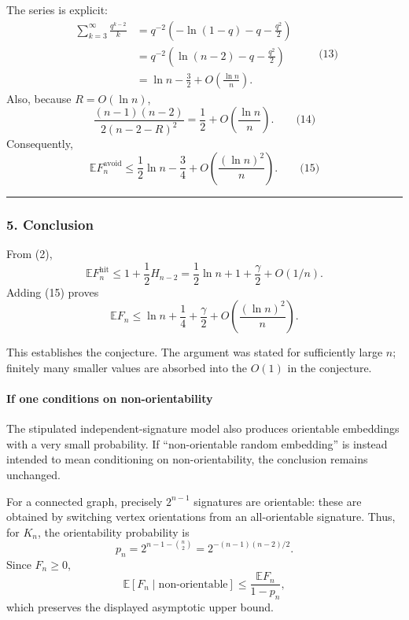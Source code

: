 \documentclass[
  11pt,
  a4paper,
]{article}
\begin{document}
The series is explicit: \begin{equation*}
\begin{aligned}
\sum_{k=3}^{\infty}\frac{q^{k-2}}{k}
&=
q^{-2}\left(-\ln(1-q)-q-\frac{q^2}{2}\right)\\
&=
q^{-2}\left(\ln(n-2)-q-\frac{q^2}{2}\right)\\
&=
\ln n-\frac32+O\!\left(\frac{\ln n}{n}\right).
\end{aligned}
\qquad\text{(13)}
\end{equation*} Also, because \(R=O(\ln n)\), \[
\frac{(n-1)(n-2)}{2(n-2-R)^2}
=
\frac12+O\!\left(\frac{\ln n}{n}\right).
\qquad\text{(14)}
\] Consequently, \[
\boxed{
\mathbb E F_n^{\mathrm{avoid}}
\le
\frac12\ln n-\frac34
+O\!\left(\frac{(\ln n)^2}{n}\right).
}
\qquad\text{(15)}
\]

\begin{center}\rule{0.5\linewidth}{0.5pt}\end{center}

\subsubsection{5. Conclusion}\label{conclusion}

From (2), \[
\mathbb E F_n^{\mathrm{hit}}
\le
1+\frac12H_{n-2}
=
\frac12\ln n+1+\frac{\gamma}{2}+O(1/n).
\] Adding (15) proves \[
\mathbb E F_n
\le
\ln n+\frac14+\frac{\gamma}{2}
+O\!\left(\frac{(\ln n)^2}{n}\right).
\]

This establishes the conjecture. The argument was stated for
sufficiently large \(n\); finitely many smaller values are absorbed into
the \(O(1)\) in the conjecture.

\paragraph{If one conditions on
non-orientability}\label{if-one-conditions-on-non-orientability}

The stipulated independent-signature model also produces orientable
embeddings with a very small probability. If ``non-orientable random
embedding'' is instead intended to mean conditioning on
non-orientability, the conclusion remains unchanged.

For a connected graph, precisely \(2^{n-1}\) signatures are orientable:
these are obtained by switching vertex orientations from an
all-orientable signature. Thus, for \(K_n\), the orientability
probability is \[
p_n=2^{n-1-\binom n2}
=2^{-(n-1)(n-2)/2}.
\] Since \(F_n\ge0\), \[
\mathbb E[F_n\mid\text{non-orientable}]
\le
\frac{\mathbb E F_n}{1-p_n},
\] which preserves the displayed asymptotic upper bound.
\end{document}
